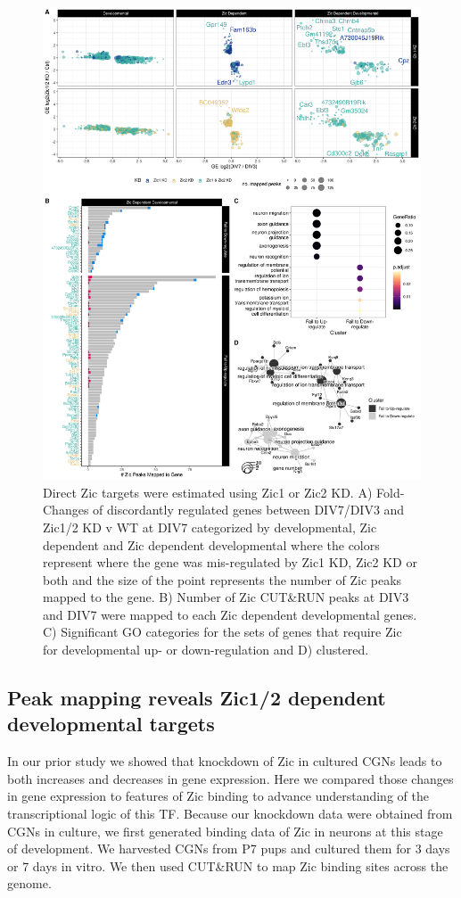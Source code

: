 \documentclass[fleqn,10pt]{wlscirep}
\begin{document}
\begin{figure}[!ht]
\includegraphics[width=.95\textwidth]{../figures/figure4.png}
\caption{Direct Zic targets were estimated using Zic1 or Zic2 KD. A) Fold-Changes of discordantly regulated genes between DIV7/DIV3 and Zic1/2 KD v WT at DIV7 categorized by developmental, Zic dependent and Zic dependent developmental where the colors represent where the gene was mis-regulated by Zic1 KD, Zic2 KD or both and the size of the point represents the number of Zic peaks mapped to the gene. B) Number of Zic CUT&RUN peaks at DIV3 and DIV7 were mapped to each Zic dependent developmental genes. C) Significant GO categories for the sets of genes that require Zic for developmental up- or down-regulation and D) clustered. }
\label{fig:ZicKD}
\end{figure}

\subsection*{Peak mapping reveals Zic1/2 dependent developmental targets}

In our prior study we showed that knockdown of Zic in cultured CGNs leads to both increases and decreases in gene expression. Here we compared those changes in gene expression to features of Zic binding to advance understanding of the transcriptional logic of this TF. Because our knockdown data were obtained from CGNs in culture, we first generated binding data of Zic in neurons at this stage of development. We harvested CGNs from P7 pups and cultured them for 3 days or 7 days in vitro. We then used CUT&RUN to map Zic binding sites across the genome. 
\end{document}
